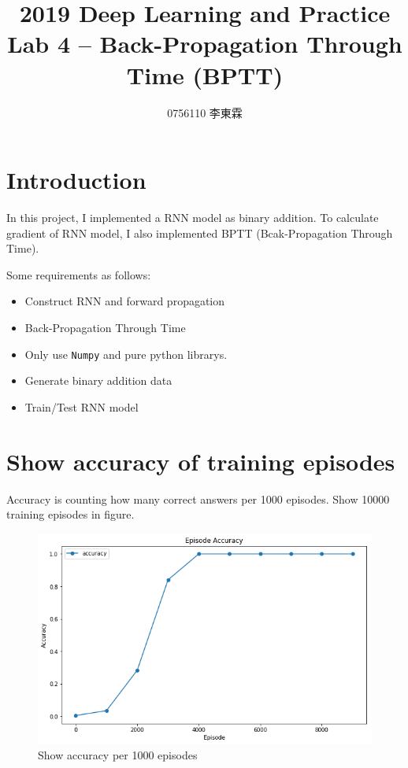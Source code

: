 \documentclass[12pt]{article}
\begin{document}
 
 
\title{2019 Deep Learning and Practice \\ Lab 4 -- Back-Propagation Through Time (BPTT)}
\author{0756110 李東霖}

\maketitle
\section{Introduction}

In this project, I implemented a RNN model as binary addition. To calculate gradient of RNN model, I also implemented BPTT (Bcak-Propagation Through Time).

Some requirements as follows:

\begin{itemize}
\item Construct RNN and forward propagation
\item Back-Propagation Through Time
\item Only use \verb|Numpy| and pure python librarys.
\item Generate binary addition data
\item Train/Test RNN model
\end{itemize}

\section{Show accuracy of training episodes}

Accuracy is counting how many correct answers per 1000 episodes. Show 10000 training episodes in figure.

\begin{figure}[H]
\centering
\includegraphics[width=\linewidth]{Images/PlotEpisodes.png}
\caption{Show accuracy per 1000 episodes}
\end{figure}
\end{document}
